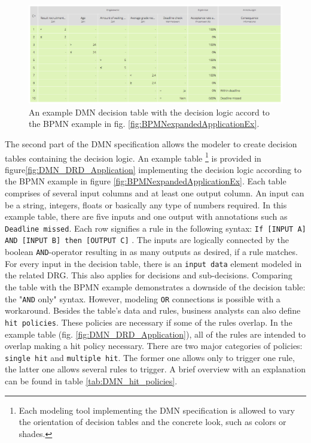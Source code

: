 \begin{figure}
\includegraphics[width=\textwidth]{../figures/chapter_indicators/DMN_Application_Example_Decision_Table_ToR.png} 
\caption{An example DMN decision table with the decision logic accord to the BPMN example in fig. \ref{fig:BPMNexpandedApplicationEx}.}
\label{fig:DMN_decision_table_application}
\end{figure}

The second part of the DMN specification allows the modeler to create decision tables containing the decision logic. An example table \footnote{Each modeling tool implementing the DMN specification is allowed to vary the orientation of decision tables and the concrete look, such as colors or shades.} is provided in figure\ref{fig:DMN_DRD_Application} implementing the decision logic according to the BPMN example in figure \ref{fig:BPMNexpandedApplicationEx}. Each table comprises of several input columns and at least one output column. An input can be a string, integers, floats or basically any type of numbers required. In this example table, there are five inputs and one output with annotations such as \texttt{Deadline missed}. Each row signifies a rule in the following syntax: \texttt{If [INPUT A] AND [INPUT B] then [OUTPUT C]} \cite{DMNspec2016}. The inputs are logically connected by the boolean \texttt{AND}-operator resulting in as many outputs as desired, if a rule matches. For every input in the decision table, there is an \texttt{input data} element modeled in the related \ac{DRG}. This also applies for decisions and sub-decisions. 
Comparing the table with the BPMN example demonstrates a downside of the decision table: the "\texttt{AND} only" syntax. However, modeling \texttt{OR} connections is possible with a workaround. Besides the table's data and rules, business analysts can also define \texttt{hit policies}. These policies are necessary if some of the rules overlap. In the example table (fig. \ref{fig:DMN_DRD_Application}), all of the rules are intended to overlap making a hit policy necessary. There are two major categories of policies: \texttt{single hit} and \texttt{multiple hit}. The former one allows only to trigger one rule, the latter one allows several rules to trigger. A brief overview with an explanation can be found in table \ref{tab:DMN_hit_policies}. 

